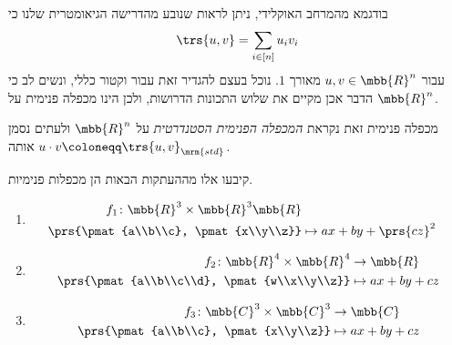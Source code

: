 \documentclass[a4paper,10pt,twoside,openany]{book}
\begin{document}
\begin{remark}
בודגמא מהמרחב האוקלידי, ניתן לראות שנובע מהדרישה הגיאומטרית שלנו כי
\[\trs{u,v} = \sum_{i \in [n]} u_i v_i\]
עבור
$u,v \in \mbb{R}^n$
מאורך
$1$.
נוכל בעצם להגדיר זאת עבור וקטור כללי, ונשים לב כי הדבר אכן מקיים את שלוש התכונות הדרושות, ולכן הינו מכפלה פנימית על
$\mbb{R}^n$.

מכפלה פנימית זאת נקראת
\emph{המכפלה הפנימית הסטנדרטית}
על
$\mbb{R}^n$
ולעתים נסמן אותה
$u \cdot v \coloneqq \trs{u,v}_{\mrm{std}}$.
\end{remark}

\begin{exercisechap}
קיבעו אלו מההעתקות הבאות הן מכפלות פנימיות.

\begin{enumerate}
\item
\begin{align*}
f_1 \colon \mbb{R}^3 \times \mbb{R}^3 \mbb{R} \\
\prs{\pmat{a\\b\\c}, \pmat{x\\y\\z}} &\mapsto ax + by + \prs{cz}^2
\end{align*}

\item
\begin{align*}
f_2 \colon \mbb{R}^4 \times \mbb{R}^4 &\to \mbb{R} \\
\prs{\pmat{a\\b\\c\\d}, \pmat{w\\x\\y\\z}} &\mapsto ax + by + cz 
\end{align*}

\item
\begin{align*}
f_3 \colon \mbb{C}^3 \times \mbb{C}^3 &\to \mbb{C} \\
\prs{\pmat{a\\b\\c}, \pmat{x\\y\\z}} &\mapsto ax + by + cz
\end{align*}
\end{enumerate}
\end{exercisechap}
\end{document}
